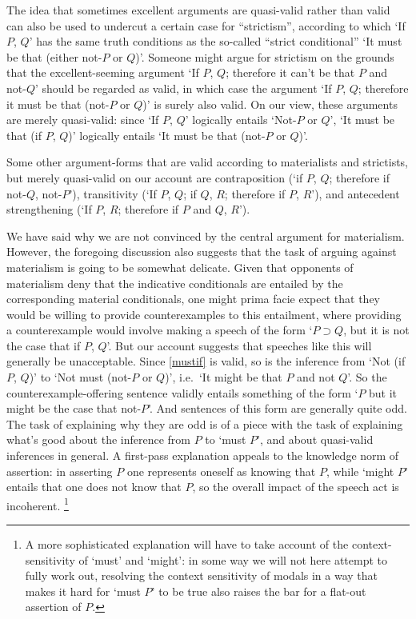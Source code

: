 \documentclass[If.tex]{subfiles}
\begin{document}
\begin{prop}


The idea that sometimes excellent arguments are quasi-valid rather than valid can also be used to undercut a certain case for “strictism”, according to which ‘If $P$, $Q$’ has the same truth conditions as the so-called “strict conditional” ‘It must be that (either not-$P$ or $Q$)’. Someone might argue for strictism on the grounds that the excellent-seeming argument ‘If $P$, $Q$; therefore it can't be that $P$ and not-$Q$’ should be regarded as valid, in which case the argument ‘If $P$, $Q$; therefore it must be that (not-$P$ or $Q$)’ is surely also valid. On our view, these arguments are merely quasi-valid: since ‘If $P$, $Q$’ logically entails ‘Not-$P$ or $Q$’, ‘It must be that (if $P$, $Q$)’ logically entails ‘It must be that (not-$P$ or $Q$)’.

Some other argument-forms that are valid according to materialists and strictists, but merely quasi-valid on our account are contraposition (‘if $P$, $Q$; therefore if not-$Q$, not-$P$’), transitivity (‘If $P$, $Q$; if $Q$, $R$; therefore if $P$, $R$’), and antecedent strengthening (‘If $P$, $R$; therefore if $P$ and $Q$, $R$’).

We have said why we are not convinced by the central argument for materialism.  However, the foregoing discussion also suggests that the task of arguing against materialism is going to be somewhat delicate.  Given that opponents of materialism deny that the indicative conditionals are entailed by the corresponding material conditionals, one might prima facie expect that they would be willing to provide counterexamples to this entailment, where providing a counterexample would involve making a speech of the form ‘$P ⊃ Q$, but it is not the case that if $P$, $Q$’.  But our account suggests that speeches like this will generally be unacceptable.  Since \ref{mustif} is valid, so is the inference from ‘Not (if $P$, $Q$)’ to ‘Not must (not-$P$ or $Q$)’, i.e.\ ‘It might be that $P$ and not $Q$’.  So the counterexample-offering sentence validly entails something of the form ‘$P$ but it might be the case that not-$P$’.  And sentences of this form are generally quite odd.  The task of explaining why they are odd is of a piece with the task of explaining what's good about the inference from $P$ to ‘must $P$’, and about quasi-valid inferences in general.  A first-pass explanation appeals to the knowledge norm of assertion: in asserting $P$ one represents oneself as knowing that $P$, while ‘might $P$’ entails that one does not know that $P$, so the overall impact of the speech act is incoherent.%
\footnote{A more sophisticated explanation will have to take account of the context-sensitivity of ‘must’ and ‘might’: in some way we will not here attempt to fully work out, resolving the context sensitivity of modals in a way that makes it hard for ‘must $P$’ to be true also raises the bar for a flat-out assertion of $P$.}


\end{prop}
\end{document}
